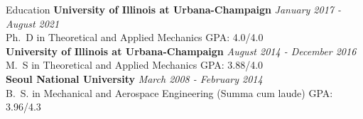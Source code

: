\documentclass{resume} %
\begin{document}

\begin{rSection}{Education}
{\bf University of Illinois at Urbana-Champaign} \hfill {\em January 2017 - August 2021}
\\ Ph.\ D in Theoretical and Applied Mechanics \hfill {GPA: 4.0/4.0}\\
{\bf University of Illinois at Urbana-Champaign} \hfill {\em August 2014 - December 2016}
\\ M.\ S in Theoretical and Applied Mechanics \hfill {GPA: 3.88/4.0}\\
{\bf Seoul National University} \hfill {\em March 2008 - February 2014}
\\ B.\ S. in Mechanical and Aerospace Engineering (Summa cum laude) \hfill {GPA: 3.96/4.3}
\end{rSection}



\end{document}
